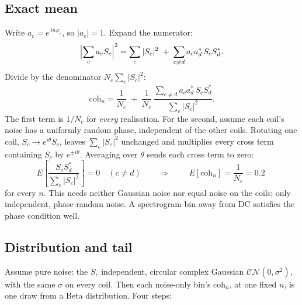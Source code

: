 \documentclass[11pt]{article}
\begin{document}
\subsection{Exact mean}
Write $a_c=e^{\,in\varphi_c}$, so $|a_c|=1$. Expand the numerator:
\[
\Bigl|\sum_c a_c S_c\Bigr|^2
= \sum_c |S_c|^2 \;+\; \sum_{c\neq d} a_c a_d^{*}\, S_c S_d^{*} .
\]
Divide by the denominator $N_c\sum_c|S_c|^2$:
\[
\mathrm{coh}_n = \frac{1}{N_c}
\;+\; \frac{1}{N_c}\,\frac{\sum_{c\neq d} a_c a_d^{*}\, S_c S_d^{*}}{\sum_e |S_e|^2} .
\]
The first term is $1/N_c$ for \emph{every} realisation. For the second,
assume each coil's noise has a uniformly random phase, independent of the
other coils. Rotating one coil, $S_c\to e^{i\theta}S_c$, leaves
$\sum_e|S_e|^2$ unchanged and multiplies every cross term containing $S_c$
by $e^{\pm i\theta}$. Averaging over $\theta$ sends each cross term to zero:
\[
E\!\left[\frac{S_c S_d^{*}}{\sum_e |S_e|^2}\right] = 0 \quad (c\neq d)
\qquad\Longrightarrow\qquad
\boxed{\;E[\mathrm{coh}_n] = \frac{1}{N_c} = 0.2\;}
\]
for every $n$. This needs neither Gaussian noise nor equal noise on the
coils; only independent, phase-random noise. A spectrogram bin away from
DC satisfies the phase condition well.

\subsection{Distribution and tail}
Assume pure noise: the $S_c$ independent, circular complex Gaussian
$\mathcal{CN}(0,\sigma^2)$, with the same $\sigma$ on every coil. Then each
noise-only bin's $\mathrm{coh}_n$, at one fixed $n$, is one draw from a Beta
distribution. Four steps:
\end{document}
